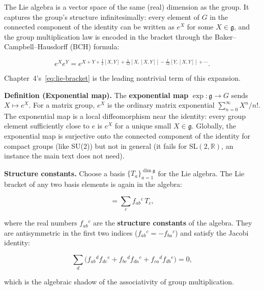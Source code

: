 The Lie algebra is a vector space of the same (real) dimension as the group. It captures the group's structure infinitesimally: every element of $G$ in the connected component of the identity can be written as $e^X$ for some $X \in \mathfrak{g}$, and the group multiplication law is encoded in the bracket through the Baker--Campbell--Hausdorff (BCH) formula:
\begin{linenomath}
    \begin{equation}
        e^X e^Y = e^{X + Y + \frac{1}{2}[X,Y] + \frac{1}{12}[X,[X,Y]] - \frac{1}{12}[Y,[X,Y]] + \cdots}.
        \label{eq:bch-formula}
    \end{equation}
\end{linenomath}
Chapter~4's~\eqref{eq:lie-bracket} is the leading nontrivial term of this expansion.

\medskip\noindent\textbf{Definition (Exponential map).} The \textbf{exponential map} $\exp : \mathfrak{g} \to G$ sends $X \mapsto e^X$. For a matrix group, $e^X$ is the ordinary matrix exponential $\sum_{n=0}^\infty X^n/n!$. The exponential map is a local diffeomorphism near the identity: every group element sufficiently close to $e$ is $e^X$ for a unique small $X \in \mathfrak{g}$. Globally, the exponential map is surjective onto the connected component of the identity for compact groups (like SU(2)) but not in general (it fails for $\mathrm{SL}(2,\mathbb{R})$, an instance the main text does not need).

\medskip\noindent\textbf{Structure constants.} Choose a basis $\{T_a\}_{a=1}^{\dim \mathfrak{g}}$ for the Lie algebra. The Lie bracket of any two basis elements is again in the algebra:
\begin{linenomath}
    \begin{equation}
        [T_a, T_b] = \sum_{c} f_{ab}{}^c\,T_c,
        \label{eq:app-structure-constants}
    \end{equation}
\end{linenomath}
where the real numbers $f_{ab}{}^c$ are the \textbf{structure constants} of the algebra. They are antisymmetric in the first two indices ($f_{ab}{}^c = -f_{ba}{}^c$) and satisfy the Jacobi identity:
\begin{linenomath}
    \begin{equation}
        \sum_{d} \bigl( f_{ab}{}^d f_{dc}{}^e + f_{bc}{}^d f_{da}{}^e + f_{ca}{}^d f_{db}{}^e \bigr) = 0,
        \label{eq:jacobi-identity}
    \end{equation}
\end{linenomath}
which is the algebraic shadow of the associativity of group multiplication.

